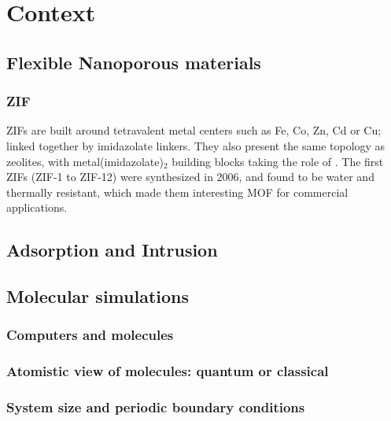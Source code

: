 \documentclass[thesis]{subfiles}
\begin{document}
\chapter{Context}
\startcontents[chapters]
\printpartialtoc

\section{Flexible Nanoporous materials}


\subsection{ZIF}

ZIFs are built around tetravalent metal centers such as Fe, Co, Zn, Cd or Cu;
linked together by imidazolate linkers.  They also present the same topology as
zeolites, with metal(imidazolate)$_2$ building blocks taking the role of
. The first ZIFs (ZIF-1 to ZIF-12) were synthesized in
2006\cite{Park2006}, and found to be water and thermally resistant, which made
them interesting MOF for commercial applications.

\section{Adsorption and Intrusion}

\section{Molecular simulations}

\subsection{Computers and molecules}

\subsection{Atomistic view of molecules: quantum or classical}

\subsection{System size and periodic boundary conditions}

\OnlyInSubfile{\printbibliography}
\end{document}
